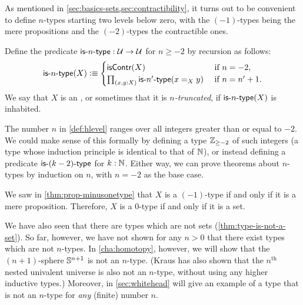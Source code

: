 As mentioned in \cref{sec:basics-sets,sec:contractibility}, it turns out to be convenient to define $n$-types starting two levels below zero, with the $(-1)$-types being the mere propositions and the $(-2)$-types the contractible ones.

\begin{defn}\label{def:hlevel}
  Define the predicate $\mathsf{is}\mbox{-}{n}\mbox{-}\mathsf{type} : \mathcal{U} \to \mathcal{U}$ for $n \geq -2$ by recursion as follows:
  \[ \istype{n}(X) \defeq
  \begin{cases}
    \iscontr(X) & \text{ if } n = -2, \\
    \prd{x,y : X} \istype{n'}(\id[X]{x}{y}) & \text{ if } n = n'+1.
  \end{cases}
  \]
  We say that $X$ is an , or sometimes that it is \emph{$n$-truncated},
 if $\mathsf{is}\mbox{-}{n}\mbox{-}\mathsf{type}(X)$ is inhabited.
\end{defn}

\begin{rmk}
  The number $n$ in \cref{def:hlevel} ranges over all integers greater than or equal to $-2$.
  We could make sense of this formally by defining a type $\mathbb{Z}_{{\geq}-2}$ of such integers (a type whose induction principle is identical to that of $\mathbb{N}$), or instead defining a predicate $\mathsf{is}\mbox{-}{(k-2)}\mbox{-}\mathsf{type}$ for $k : \mathbb{N}$.
  Either way, we can prove theorems about $n$-types by induction on $n$, with $n = -2$ as the base case.
\end{rmk}

\begin{eg}
  We saw in \cref{thm:prop-minusonetype} that $X$ is a $(-1)$-type if and only if it is a mere proposition.
  Therefore, $X$ is a $0$-type if and only if it is a set.
\end{eg}

We have also seen that there are types which are not sets (\cref{thm:type-is-not-a-set}).
So far, however, we have not shown for any $n>0$ that there exist types which are not $n$-types.
In \cref{cha:homotopy}, however, we will show that the $(n+1)$-sphere $\mathbb{S}^{n+1}$ is not an $n$-type.
(Kraus has also shown that the $n^{\mathrm{th}}$ nested univalent universe is also not an $n$-type, without using any higher inductive types.)
Moreover, in \cref{sec:whitehead} will give an example of a type that is not an $n$-type for \emph{any} (finite) number $n$.

